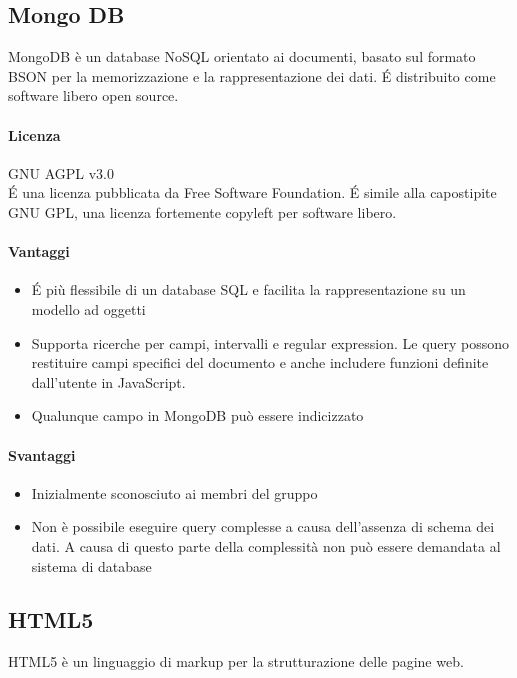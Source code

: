 \subsection{Mongo DB}
MongoDB è un database NoSQL orientato ai documenti, basato sul formato BSON per la memorizzazione e la rappresentazione dei dati. \'E distribuito come software libero open source. \\

\paragraph{Licenza} GNU AGPL v3.0 \\
\'E una licenza pubblicata da Free Software Foundation. \'E simile alla capostipite GNU GPL, una licenza fortemente copyleft per software libero.

\paragraph{Vantaggi}
\begin{itemize}
	\item \'E più flessibile di un database SQL e facilita la rappresentazione su un modello ad
	oggetti
	\item Supporta ricerche per campi, intervalli e regular expression. Le query possono restituire campi specifici del documento e anche includere funzioni definite dall'utente in JavaScript.
	\item Qualunque campo in MongoDB può essere indicizzato 
\end{itemize}


\paragraph{Svantaggi} 
\begin{itemize}
	\item Inizialmente sconosciuto ai membri del gruppo
     \item Non è possibile eseguire query complesse a causa
       dell'assenza di schema dei dati. A causa di questo parte della
       complessità non può essere demandata al sistema di database
\end{itemize}

\subsection{HTML5}
HTML5 è un linguaggio di markup per la strutturazione delle pagine web.

